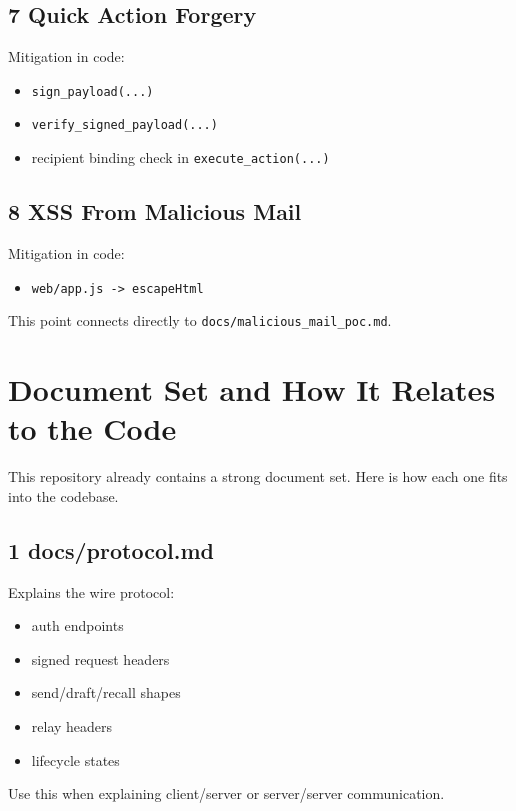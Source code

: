 \documentclass[11pt,a4paper]{article}
\begin{document}
\subsection{7 Quick Action Forgery}

Mitigation in code:

\begin{itemize}
\item \nolinkurl{sign_payload(...)}
\item \nolinkurl{verify_signed_payload(...)}
\item recipient binding check in \nolinkurl{execute_action(...)}
\end{itemize}

\subsection{8 XSS From Malicious Mail}

Mitigation in code:

\begin{itemize}
\item \nolinkurl{web/app.js -> escapeHtml}
\end{itemize}

This point connects directly to \nolinkurl{docs/malicious_mail_poc.md}.


\section{Document Set and How It Relates to the Code}

This repository already contains a strong document set. Here is how each one fits into the codebase.

\subsection{1 docs/protocol.md}

Explains the wire protocol:

\begin{itemize}
\item auth endpoints
\item signed request headers
\item send/draft/recall shapes
\item relay headers
\item lifecycle states
\end{itemize}

Use this when explaining client/server or server/server communication.
\end{document}
